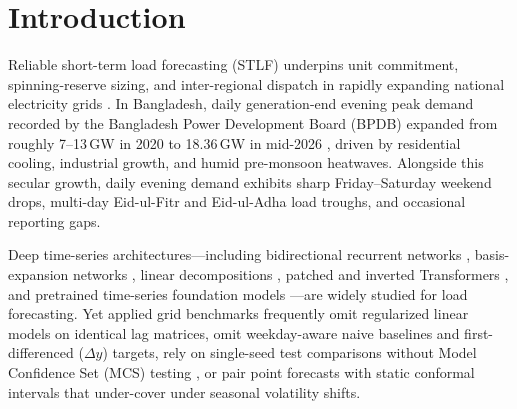 \documentclass[5p,twocolumn,authoryear]{elsarticle}
\begin{document}
\section{Introduction}
Reliable short-term load forecasting (STLF) underpins unit commitment, spinning-reserve sizing, and inter-regional dispatch in rapidly expanding national electricity grids \citep{hong2016probabilistic,hong2020energy,kuster2017electrical}. In Bangladesh, daily generation-end evening peak demand recorded by the Bangladesh Power Development Board (BPDB) expanded from roughly 7--13\,GW in 2020 to 18.36\,GW in mid-2026 \citep{bpdb2025annual}, driven by residential cooling, industrial growth, and humid pre-monsoon heatwaves. Alongside this secular growth, daily evening demand exhibits sharp Friday--Saturday weekend drops, multi-day Eid-ul-Fitr and Eid-ul-Adha load troughs, and occasional reporting gaps.

Deep time-series architectures---including bidirectional recurrent networks \citep{hochreiter1997lstm,cho2014gru,schuster1997birnn,kong2019stlf}, basis-expansion networks \citep{oreshkin2020nbeats,challu2023nhits}, linear decompositions \citep{zeng2023dlinear}, patched and inverted Transformers \citep{nie2023patchtst,wu2023timesnet,liu2024itransformer}, and pretrained time-series foundation models \citep{ansari2024chronos,das2024timesfm}---are widely studied for load forecasting. Yet applied grid benchmarks frequently omit regularized linear models on identical lag matrices, omit weekday-aware naive baselines and first-differenced ($\Delta y$) targets, rely on single-seed test comparisons without Model Confidence Set (MCS) testing \citep{hansen2011mcs}, or pair point forecasts with static conformal intervals that under-cover under seasonal volatility shifts.
\end{document}
